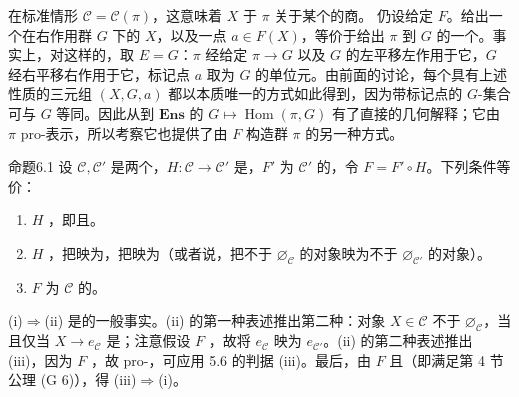 在标准情形 $\mathcal C=\mathcal C(\pi)$，这意味着 $X$ 于 $\pi$ 关于某个的商。
仍设给定 $F$。给出一个在右作用群 $G$ 下的 $X$，以及一点 $a\in F(X)$，等价于给出 $\pi$ 到 $G$ 的一个。事实上，对这样的，取 $E=G$：$\pi$ 经给定 $\pi\to G$ 以及 $G$ 的左平移左作用于它，$G$ 经右平移右作用于它，标记点 $a$ 取为 $G$ 的单位元。由前面的讨论，每个具有上述性质的三元组 $(X,G,a)$ 都以本质唯一的方式如此得到，因为带标记点的 $G$-集合可与 $G$ 等同。因此从到 $\mathbf{Ens}$ 的 $G\mapsto\operatorname{Hom}(\pi,G)$ 有了直接的几何解释；它由 $\pi$ pro-表示，所以考察它也提供了由 $F$ 构造群 $\pi$ 的另一种方式。
\begin{SGAresult}{命题}{6.1}
设 $\mathcal C,\mathcal C'$ 是两个，$H:\mathcal C\to\mathcal C'$ 是，$F'$ 为 $\mathcal C'$ 的，令 $F=F'\circ H$。下列条件等价：
\begin{enumerate}
\item[(i)] $H$ ，即且。
\item[(ii)] $H$ ，把映为，把映为（或者说，把不于 $\varnothing_{\mathcal C}$ 的对象映为不于 $\varnothing_{\mathcal C'}$ 的对象）。
\item[(iii)] $F$ 为 $\mathcal C$ 的。
\end{enumerate}
\end{SGAresult}
(i)$\Rightarrow$(ii) 是的一般事实。(ii) 的第一种表述推出第二种：对象 $X\in\mathcal C$ 不于 $\varnothing_{\mathcal C}$，当且仅当 $X\to e_{\mathcal C}$ 是；注意假设 $F$ ，故将 $e_{\mathcal C}$ 映为 $e_{\mathcal C'}$。(ii) 的第二种表述推出 (iii)，因为 $F$ ，故 pro-，可应用 5.6 的判据 (iii)。最后，由 $F$ 且（即满足第 4 节公理 (G 6)），得 (iii)$\Rightarrow$(i)。
